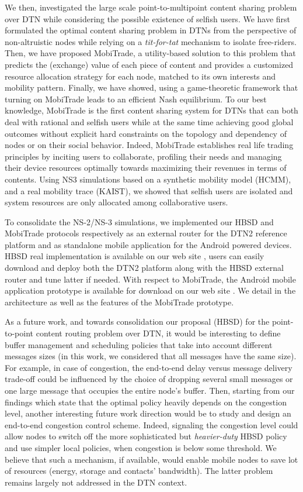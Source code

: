 We then, investigated the large scale point-to-multipoint content sharing problem over DTN while considering the possible existence of selfish users. We have first formulated the optimal content sharing problem in DTNs from the perspective of non-altruistic nodes while relying on a \emph{tit-for-tat} mechanism to isolate free-riders. Then, we have proposed MobiTrade, a utility-based solution to this problem that predicts the (exchange) value of each piece of content and provides a customized resource allocation strategy for each node, matched to its own interests and mobility pattern. Finally, we have showed, using a game-theoretic framework that turning on MobiTrade leads to an efficient Nash equilibrium. To our best knowledge, MobiTrade is the first content sharing
system for DTNs that can both deal with rational and selfish users while at the same time achieving good global outcomes
without explicit hard constraints on the topology and dependency of nodes or on their social behavior. Indeed, MobiTrade establishes real life trading principles by inciting users to collaborate, profiling their needs and managing their device resources optimally towards maximizing their revenues in terms of contents. Using NS3 simulations based on a synthetic mobility model (HCMM), and a real mobility trace (KAIST), we showed that selfish users are isolated and system resources are only allocated among collaborative users. 

To consolidate the NS-2/NS-3 simulations, we implemented our HBSD and MobiTrade protocols respectively as an external router for the DTN2 reference platform and as standalone mobile application for the Android powered devices. HBSD real implementation is available on our web site \cite{HBSDDTN2}, users can easily download and deploy both the DTN2 platform along with the HBSD external router and tune latter if needed. With respect to MobiTrade, the Android mobile application prototype is available for download on our web site \cite{MobiTradeAndroid}. We detail in \cite{MobiTradeAndroid} the architecture as well as the features of the MobiTrade prototype. 

As a future work, and towards consolidation our proposal (HBSD) for the point-to-point content routing problem over DTN, it would be interesting to define buffer management and scheduling policies that take into account different messages sizes (in this work, we considered that all messages have the same size). For example, in case of congestion, the end-to-end delay versus message delivery trade-off could be influenced by the choice of dropping several small messages or one large message that occupies the entire node's buffer. Then, starting from our findings which state that the optimal policy heavily depends on the congestion level, another interesting future work direction would be to study and design an end-to-end congestion control scheme. Indeed, signaling the congestion level could allow nodes to switch off the more sophisticated but \emph{heavier-duty} HBSD policy and use simpler local policies, when congestion is below some threshold. We believe that such a mechanism, if available, would enable mobile nodes to save lot of resources (energy, storage and contacts' bandwidth). The latter problem remains largely not addressed in the DTN context.

